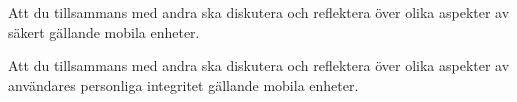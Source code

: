 \item Att du tillsammans med andra ska diskutera och reflektera över olika 
aspekter av säkert gällande mobila enheter.
\item Att du tillsammans med andra ska diskutera och reflektera över olika 
aspekter av användares personliga integritet gällande mobila enheter.
